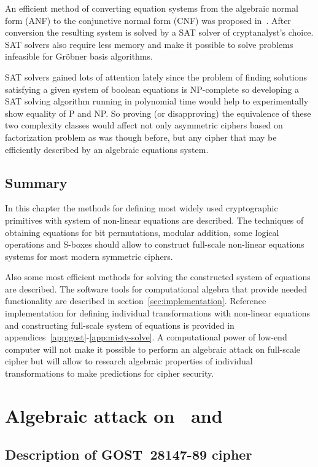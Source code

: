 An efficient method of converting equation systems from the algebraic normal
form (ANF) to the conjunctive normal form (CNF) was proposed
in~\cite{cryptoeprint-2007-024}. After conversion the resulting system is
solved by a SAT solver of cryptanalyst's choice. SAT solvers also require less
memory and make it possible to solve problems infeasible for Gr\"obner basis
algorithms.

SAT solvers gained lots of attention lately since the problem of finding
solutions satisfying a given system of boolean equations is \mbox{NP-complete}
so developing a SAT solving algorithm running in polynomial time would help to
experimentally show equality of P and NP. So proving (or disapproving) the
equivalence of these two complexity classes would affect not only asymmetric
ciphers based on factorization problem as was though before, but any cipher that
may be efficiently described by an algebraic equations system.


\section{Summary}

In this chapter the methods for defining most widely used cryptographic
primitives with system of non-linear equations are described. The techniques of
obtaining equations for bit permutations, modular addition, some logical
operations and S-boxes should allow to construct full-scale non-linear equations
systems for most modern symmetric ciphers.

Also some most efficient methods for solving the constructed system of equations
are described. The software tools for computational algebra that provide needed
functionality are described in section~\ref{sec:implementation}. Reference
implementation for defining individual transformations with non-linear equations
and constructing full-scale system of equations is provided in
appendices~\ref{app:gost}-\ref{app:misty-solve}. A computational power of
low-end computer will not make it possible to perform an algebraic attack on
full-scale cipher but will allow to research algebraic properties of individual
transformations to make predictions for cipher security.


\chapter{Algebraic attack on \gost\ and \misty}


\section{Description of GOST~28147-89 cipher}
\label{sec:algebraic-gost}

